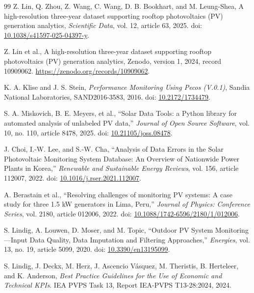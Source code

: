 \documentclass[preprint,12pt]{elsarticle}
\begin{document}
\begingroup\fontsize{9.0}{10.1}\selectfont\sloppy\setlength{\emergencystretch}{5em}\setlength{\bibsep}{0pt}
\begin{thebibliography}{99}
 Z. Lin, Q. Zhou, Z. Wang, C. Wang, D. B. Bookhart, and M. Leung-Shea, A high-resolution three-year dataset supporting rooftop photovoltaics (PV) generation analytics, \emph{Scientific Data}, vol. 12, article 63, 2025. doi: \href{https://doi.org/10.1038/s41597-025-04397-y}{10.1038/s41597-025-04397-y}.

 Z. Lin et al., A high-resolution three-year dataset supporting rooftop photovoltaics (PV) generation analytics, Zenodo, version 1, 2024, record 10909062. \url{https://zenodo.org/records/10909062}.

 K. A. Klise and J. S. Stein, \emph{Performance Monitoring Using Pecos (V.0.1)}, Sandia National Laboratories, SAND2016-3583, 2016. doi: \href{https://doi.org/10.2172/1734479}{10.2172/1734479}.

 S. A. Miskovich, B. E. Meyers, et al., ``Solar Data Tools: a Python library for automated analysis of unlabeled PV data,'' \emph{Journal of Open Source Software}, vol. 10, no. 110, article 8478, 2025. doi: \href{https://doi.org/10.21105/joss.08478}{10.21105/joss.08478}.

 J. Choi, I.-W. Lee, and S.-W. Cha, ``Analysis of Data Errors in the Solar Photovoltaic Monitoring System Database: An Overview of Nationwide Power Plants in Korea,'' \emph{Renewable and Sustainable Energy Reviews}, vol. 156, article 112007, 2022. doi: \href{https://doi.org/10.1016/j.rser.2021.112007}{10.1016/j.rser.2021.112007}.

 A. Berastain et al., ``Resolving challenges of monitoring PV systems: A case study for three 1.5 kW generators in Lima, Peru,'' \emph{Journal of Physics: Conference Series}, vol. 2180, article 012006, 2022. doi: \href{https://doi.org/10.1088/1742-6596/2180/1/012006}{10.1088/1742-6596/2180/1/012006}.

 S. Lindig, A. Louwen, D. Moser, and M. Topic, ``Outdoor PV System Monitoring---Input Data Quality, Data Imputation and Filtering Approaches,'' \emph{Energies}, vol. 13, no. 19, article 5099, 2020. doi: \href{https://doi.org/10.3390/en13195099}{10.3390/en13195099}.

 S. Lindig, J. Deckx, M. Herz, J. Ascencio V\'{a}squez, M. Theristis, B. Herteleer, and K. Anderson, \emph{Best Practice Guidelines for the Use of Economic and Technical KPIs}. IEA PVPS Task 13, Report IEA-PVPS T13-28:2024, 2024.


\end{thebibliography}
\end{document}
